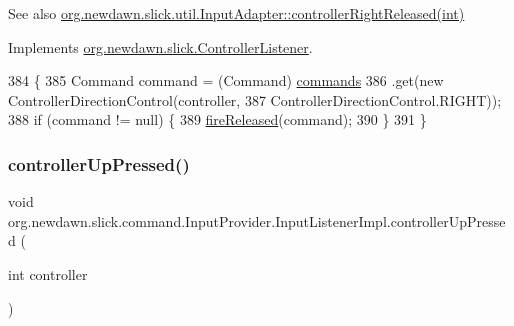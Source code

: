 \begin{DoxySeeAlso}{See also}
\mbox{\hyperlink{classorg_1_1newdawn_1_1slick_1_1util_1_1_input_adapter_ae2c91a34637c5d9af99d2098878b367e}{org.\+newdawn.\+slick.\+util.\+Input\+Adapter\+::controller\+Right\+Released(int)}} 
\end{DoxySeeAlso}


Implements \mbox{\hyperlink{interfaceorg_1_1newdawn_1_1slick_1_1_controller_listener_a33ee418e010e69783169b3f52fb62c3b}{org.\+newdawn.\+slick.\+Controller\+Listener}}.


\begin{DoxyCode}
384                                                             \{
385             Command command = (Command) \mbox{\hyperlink{classorg_1_1newdawn_1_1slick_1_1command_1_1_input_provider_ab2bd0c08506a59bc7457d7a87cf873d2}{commands}}
386                     .\textcolor{keyword}{get}(\textcolor{keyword}{new} ControllerDirectionControl(controller,
387                             ControllerDirectionControl.RIGHT));
388             \textcolor{keywordflow}{if} (command != null) \{
389                 \mbox{\hyperlink{classorg_1_1newdawn_1_1slick_1_1command_1_1_input_provider_afede03e3ab95cb0248635cf64de6874c}{fireReleased}}(command);
390             \}
391         \}
\end{DoxyCode}
\mbox{\label{classorg_1_1newdawn_1_1slick_1_1command_1_1_input_provider_1_1_input_listener_impl_a6e6f72ea130bc39ce0d96db6d4f80d8c}} 
\subsubsection{\texorpdfstring{controller\+Up\+Pressed()}{controllerUpPressed()}}
{\footnotesize\ttfamily void org.\+newdawn.\+slick.\+command.\+Input\+Provider.\+Input\+Listener\+Impl.\+controller\+Up\+Pressed (\begin{DoxyParamCaption}\item[{int}]{controller }\end{DoxyParamCaption})\hspace{0.3cm}{\ttfamily [inline]}}

